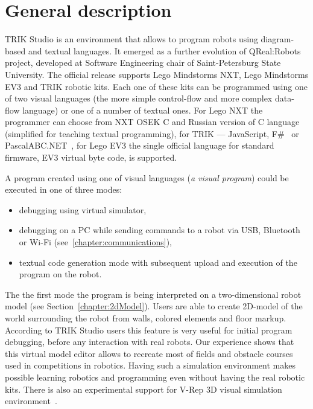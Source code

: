\documentclass[conference]{IEEEtran}
\begin{document}
\section{General description}
\label{chapter:generalDescription}

TRIK Studio is an environment that allows to program robots using diagram-based and textual languages. It 	emerged as a further evolution of QReal:Robots~\cite{terekhov2013sreda} project, developed at Software Engineering chair of Saint-Petersburg State University. The official release supports Lego Mindstorms NXT, Lego Mindstorms EV3 and TRIK robotic kits. Each one of these kits can be programmed using one of two visual languages (the more simple control-flow and more complex data-flow language) or one of a number of textual ones. For Lego NXT the programmer can choose from NXT OSEK C and Russian version of C language (simplified for teaching textual programming), for TRIK --- JavaScript, F\#~\cite{kirsanov2014robotics} or PascalABC.NET~\cite{doliner2014basics}, for Lego EV3 the single official language for standard firmware, EV3 virtual byte code, is supported.

A program created using one of visual languages (\textit{a visual program}) could be executed in one of three modes:
\begin{itemize}
    \item debugging using virtual simulator,
    \item debugging on a PC while sending commands to a robot via USB, Bluetooth or Wi-Fi (see~\ref{chapter:communications}),
    \item textual code generation mode with subsequent upload and execution of the program on the robot.
\end{itemize}

The the first mode the program is being interpreted on a two-dimensional robot model (see Section~\ref{chapter:2dModel}). Users are able to create 2D-model of the world surrounding the robot from walls, colored elements and floor markup. According to TRIK Studio users this feature is very useful for initial program debugging, before any interaction with real robots. Our experience shows that this virtual model editor allows to recreate most of fields and obstacle courses used in competitions in robotics. Having such a simulation environment makes possible learning robotics and programming even without having the real robotic kits. There is also an experimental support for V-Rep 3D visual simulation environment~\cite{rohmer2013v}.
\end{document}
